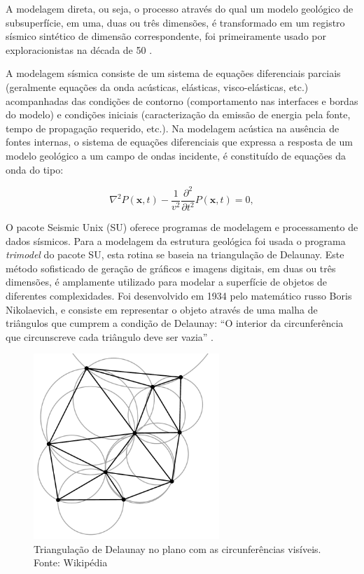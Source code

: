 A modelagem direta, ou seja, o processo através do qual um modelo geológico de subsuperfície, em uma, duas ou três dimensões, é transformado em um registro sísmico sintético de dimensão correspondente, foi primeiramente usado por exploracionistas na década de 50 \citep{Edwards(1988)}.

A modelagem sísmica consiste de um sistema de equações diferenciais parciais (geralmente equações da onda acústicas, elásticas, visco-elásticas, etc.) acompanhadas das condições de contorno (comportamento nas interfaces e bordas do modelo) e condições iniciais (caracterização da emissão de energia pela fonte, tempo de propagação requerido, etc.). Na modelagem acústica na ausência de fontes internas, o sistema de equações diferenciais que expressa a resposta de um modelo geológico a um campo de ondas incidente, é constituído de equações da onda do tipo:

\begin{equation}
\nabla^{2}P(\mathbf{x},t)-\frac{1}{v^{2}}\frac{\partial^{2}}{\partial t^{2}}P(\mathbf{x},t)= 0,
\label{eq:Equacao_onda_acustica_0}
\end{equation}


O pacote Seismic Unix (SU) oferece programas de modelagem e processamento de dados sísmicos. Para a modelagem da estrutura geológica foi usada o programa \textit{trimodel} do pacote SU, esta rotina se baseia na triangulação de Delaunay. Este método sofisticado de geração de gráficos e imagens digitais, em duas ou três dimensões, é amplamente utilizado para modelar
a superfície de objetos de diferentes complexidades. Foi desenvolvido em 1934 pelo matemático russo Boris Nikolaevich, e consiste em representar o objeto através de uma malha de triângulos que cumprem a condição de Delaunay: ``O interior da circunferência que circunscreve cada triângulo deve ser vazia'' \citep{Hale(1991)}.

\begin{figure}[H]
\centering
\includegraphics[width=7cm]{figuras/cap2/Delaunay_circumcircles_vectorial.pdf}
\caption{Triangulação de Delaunay no plano com as circunferências visíveis. Fonte: Wikipédia}
\label{fig:Delaunay_circumcircles_vectorial}
\end{figure}


